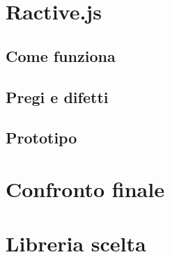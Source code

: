 \FloatBarrier
\section{Ractive.js}

\subsection{Come funziona}

\subsection{Pregi e difetti}

\subsection{Prototipo}


\clearpage
\section{Confronto finale}

\FloatBarrier
\section{Libreria scelta}


